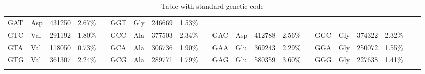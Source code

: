 \begin{table}
\begin{center}
{\begin{tabular}{*{21}{l}}
GAT & Asp & 431250	& 2.67\%	&	&
GGT & Gly & 246669	& 1.53\%&	&
\\
GTC & Val & 291192	& 1.80\%	&	&
GCC & Ala & 377503	& 2.34\%	&	&
GAC & Asp & 412788	& 2.56\%	&	&
GGC & Gly & 374322	& 2.32\%	&	&
\\
GTA & Val & 118050	& 0.73\%	&	&
GCA & Ala & 306736	& 1.90\%	&	&
GAA & Glu & 369243	& 2.29\%&	&
GGA & Gly & 250072	& 1.55\%	&	&
\\
GTG & Val & 361307	& 2.24\%	&	&
GCG & Ala & 289771	& 1.79\%	&	&
GAG & Glu & 580359	& 3.60\%	&	&
GGG & Gly & 227638	& 1.41\%	&	&
\\
\\
\hline
\end{tabular}
\caption[Genetic code table]{Table with standard genetic code}
\label{tab:sgencod}
}
\end{center}
\end{table}


